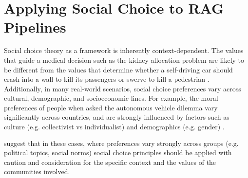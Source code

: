 \section{Applying Social Choice to RAG Pipelines}
\label{sec:social_choice}

Social choice theory as a framework is inherently context-dependent. The values that guide a medical decision such as the kidney allocation problem \citep{freedman2020akidneyallocation} are likely to be different from the values that determine whether a self-driving car should crash into a wall to kill its passengers or swerve to kill a pedestrian \citep{noothigattu2018voting}. Additionally, in many real-world scenarios, social choice preferences vary across cultural, demographic, and socioeconomic lines. For example, the moral preferences of people when asked the autonomous vehicle dilemma vary significantly across countries, and are strongly influenced by factors such as culture (e.g. collectivist vs individualist) and demographics (e.g. gender) \citep{awad2018moral}. 

\citet{pmlr-v235-conitzer24a} suggest that in these cases, where preferences vary strongly across groups (e.g. political topics, social norms) social choice principles should be applied with caution and consideration for the specific context and the values of the communities involved. 
